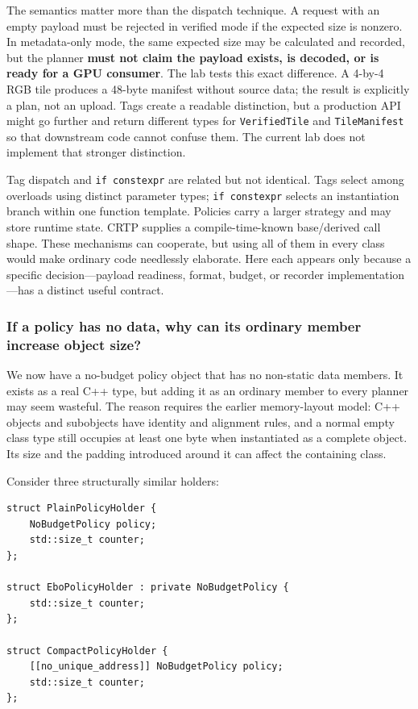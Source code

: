 The semantics matter more than the dispatch technique. A request with an empty payload must be rejected in verified mode if the expected size is nonzero. In metadata-only mode, the same expected size may be calculated and recorded, but the planner \textbf{must not claim the payload exists, is decoded, or is ready for a GPU consumer}. The lab tests this exact difference. A 4-by-4 RGB tile produces a 48-byte manifest without source data; the result is explicitly a plan, not an upload. Tags create a readable distinction, but a production API might go further and return different types for \texttt{VerifiedTile} and \texttt{TileManifest} so that downstream code cannot confuse them. The current lab does not implement that stronger distinction.

Tag dispatch and \texttt{if\ constexpr} are related but not identical. Tags select among overloads using distinct parameter types; \texttt{if\ constexpr} selects an instantiation branch within one function template. Policies carry a larger strategy and may store runtime state. CRTP supplies a compile-time-known base/derived call shape. These mechanisms can cooperate, but using all of them in every class would make ordinary code needlessly elaborate. Here each appears only because a specific decision---payload readiness, format, budget, or recorder implementation---has a distinct useful contract.

\subsubsection{If a policy has no data, why can its ordinary member increase object size?}\label{if-a-policy-has-no-data-why-can-its-ordinary-member-increase-object-size}

We now have a no-budget policy object that has no non-static data members. It exists as a real C++ type, but adding it as an ordinary member to every planner may seem wasteful. The reason requires the earlier memory-layout model: C++ objects and subobjects have identity and alignment rules, and a normal empty class type still occupies at least one byte when instantiated as a complete object. Its size and the padding introduced around it can affect the containing class.

Consider three structurally similar holders:

\begin{verbatim}
struct PlainPolicyHolder {
    NoBudgetPolicy policy;
    std::size_t counter;
};

struct EboPolicyHolder : private NoBudgetPolicy {
    std::size_t counter;
};

struct CompactPolicyHolder {
    [[no_unique_address]] NoBudgetPolicy policy;
    std::size_t counter;
};
\end{verbatim}

